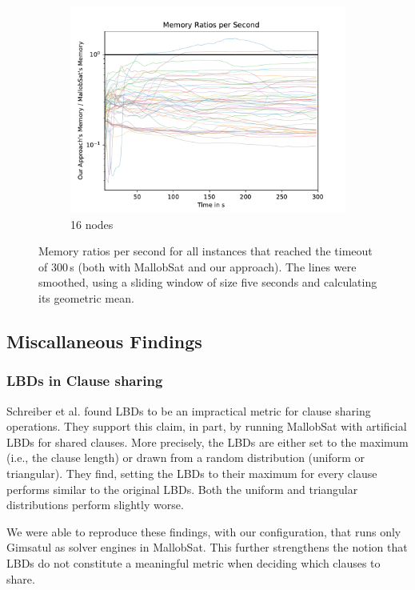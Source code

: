 \documentclass[12pt,a4paper,twoside]{scrartcl}
\numberwithin{equation}{section}
\begin{document}
\begin{figure}
\begin{subfigure}[c]{.45\textwidth}
    \includegraphics[scale=.45]{plots/16node_compare/mem_ratio_per_second.pdf}
    \caption{16 nodes}
  \end{subfigure}
  \caption{Memory ratios per second for all instances that reached the timeout of $300\,$s (both with MallobSat and our approach). The lines were smoothed, using a sliding window of size five seconds and calculating its geometric mean.}
  \label{fig:memRatiosSecs}
\end{figure}

\subsection{Miscallaneous Findings}

\subsubsection{LBDs in Clause sharing}

Schreiber et al. \cite{searchOnlyPaper} found LBDs to be an impractical metric for clause sharing operations. They support this claim, in part, by running MallobSat with artificial LBDs for shared clauses. More precisely, the LBDs are either set to the maximum (i.e., the clause length) or drawn from a random distribution (uniform or triangular). They find, setting the LBDs to their maximum for every clause performs similar to the original LBDs. Both the uniform and triangular distributions perform slightly worse.

We were able to reproduce these findings, with our configuration, that runs only Gimsatul as solver engines in MallobSat. This further strengthens the notion that LBDs do not constitute a meaningful metric when deciding which clauses to share.
\end{document}
